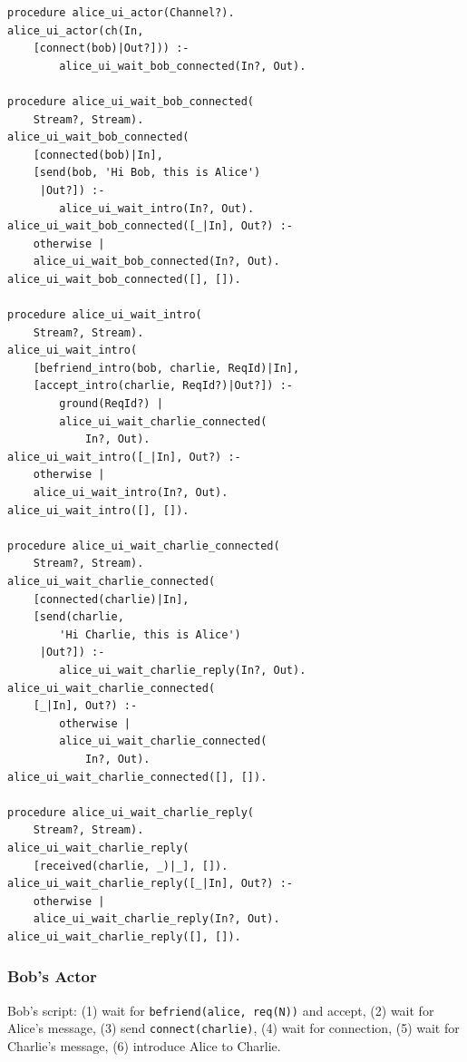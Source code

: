 \begin{verbatim}
procedure alice_ui_actor(Channel?).
alice_ui_actor(ch(In,
    [connect(bob)|Out?])) :-
        alice_ui_wait_bob_connected(In?, Out).

procedure alice_ui_wait_bob_connected(
    Stream?, Stream).
alice_ui_wait_bob_connected(
    [connected(bob)|In],
    [send(bob, 'Hi Bob, this is Alice')
     |Out?]) :-
        alice_ui_wait_intro(In?, Out).
alice_ui_wait_bob_connected([_|In], Out?) :-
    otherwise |
    alice_ui_wait_bob_connected(In?, Out).
alice_ui_wait_bob_connected([], []).

procedure alice_ui_wait_intro(
    Stream?, Stream).
alice_ui_wait_intro(
    [befriend_intro(bob, charlie, ReqId)|In],
    [accept_intro(charlie, ReqId?)|Out?]) :-
        ground(ReqId?) |
        alice_ui_wait_charlie_connected(
            In?, Out).
alice_ui_wait_intro([_|In], Out?) :-
    otherwise |
    alice_ui_wait_intro(In?, Out).
alice_ui_wait_intro([], []).

procedure alice_ui_wait_charlie_connected(
    Stream?, Stream).
alice_ui_wait_charlie_connected(
    [connected(charlie)|In],
    [send(charlie,
        'Hi Charlie, this is Alice')
     |Out?]) :-
        alice_ui_wait_charlie_reply(In?, Out).
alice_ui_wait_charlie_connected(
    [_|In], Out?) :-
        otherwise |
        alice_ui_wait_charlie_connected(
            In?, Out).
alice_ui_wait_charlie_connected([], []).

procedure alice_ui_wait_charlie_reply(
    Stream?, Stream).
alice_ui_wait_charlie_reply(
    [received(charlie, _)|_], []).
alice_ui_wait_charlie_reply([_|In], Out?) :-
    otherwise |
    alice_ui_wait_charlie_reply(In?, Out).
alice_ui_wait_charlie_reply([], []).
\end{verbatim}

\subsubsection{Bob's Actor}

Bob's script: (1) wait for \verb|befriend(alice, req(N))| and accept, (2) wait for Alice's message, (3) send \verb|connect(charlie)|, (4) wait for connection, (5) wait for Charlie's message, (6) introduce Alice to Charlie.


